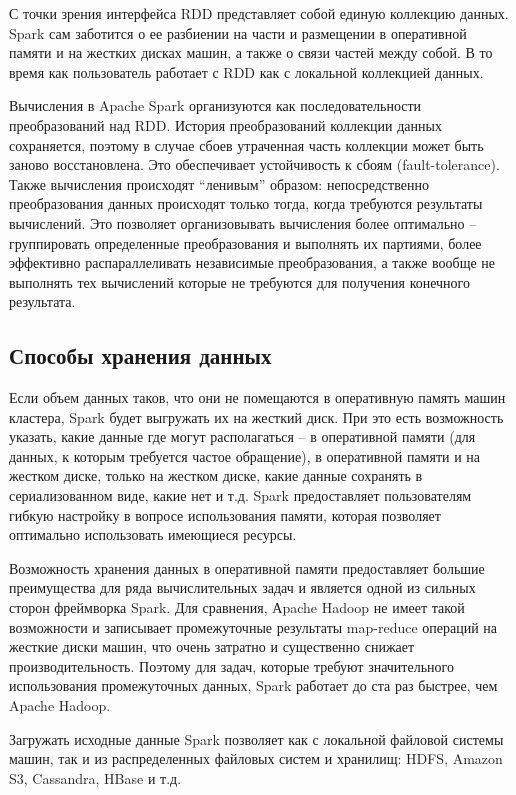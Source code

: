 \documentclass[12pt,a4paper]{report}
\begin{document}
С точки зрения интерфейса RDD представляет собой единую коллекцию данных. Spark сам заботится о ее разбиении на части и размещении в оперативной памяти и на жестких дисках машин, а также о связи частей между собой. В то время как пользователь работает с RDD как с локальной коллекцией данных. 

Вычисления в Apache Spark организуются как последовательности преобразований над RDD. История преобразований коллекции данных сохраняется, поэтому в случае сбоев утраченная часть коллекции может быть заново восстановлена. Это обеспечивает устойчивость к сбоям (fault-tolerance). Также вычисления происходят ``ленивым'' образом: непосредственно преобразования данных происходят только тогда, когда требуются результаты вычислений. Это позволяет организовывать вычисления более оптимально -- группировать определенные преобразования и выполнять их партиями, более эффективно распараллеливать независимые преобразования, а также вообще не выполнять тех вычислений которые не требуются для получения конечного результата.

\subsection{Способы хранения данных} 

Если объем данных таков, что они не помещаются в оперативную память машин кластера, Spark будет выгружать их на жесткий диск. При это есть возможность указать, какие данные где могут располагаться -- в оперативной памяти (для данных, к которым требуется частое обращение), в оперативной памяти и на жестком диске, только на жестком диске, какие данные сохранять в сериализованном виде, какие нет и т.д. Spark предоставляет пользователям гибкую настройку в вопросе использования памяти, которая позволяет оптимально использовать имеющиеся ресурсы.

Возможность хранения данных в оперативной памяти предоставляет большие преимущества для ряда вычислительных задач и является одной из сильных сторон фреймворка Spark. Для сравнения, Аpache Hadoop не имеет такой возможности и записывает промежуточные результаты map-reduce операций на жесткие диски машин, что очень затратно и существенно снижает производительность. Поэтому для задач, которые требуют значительного использования промежуточных данных, Spark работает до ста раз быстрее, чем Apache Hadoop. 

Загружать исходные данные Spark позволяет как с локальной файловой системы машин, так и из распределенных файловых систем и хранилищ: HDFS, Amazon S3, Cassandra, HBase и т.д. 
\end{document}
